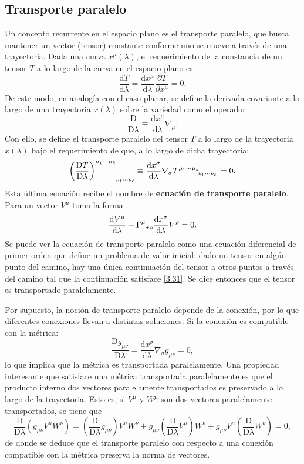\subsection{Transporte paralelo}
Un concepto recurrente en el espacio plano es el transporte paralelo, que busca mantener un vector (tensor) constante conforme uno se mueve a través de una trayectoria. Dada una curva $x^\mu(\lambda)$, el requerimiento de la constancia de un tensor $T$ a lo largo de la curva en el espacio plano es $$\frac{\mathrm{d}T}{\mathrm{d}\lambda}=\frac{\mathrm{d}x^\mu}{\mathrm{d}\lambda}\frac{\partial T}{\partial x^\mu}=0.$$ De este modo, en analogía con el caso planar, se define la derivada covariante a lo largo de una trayectoria $x(\lambda)$  sobre la variedad como el operador
\begin{equation}
\frac{\mathrm{D}}{\mathrm{D}\lambda}\equiv \frac{\mathrm{d}x^\mu}{\mathrm{d}\lambda}\nabla_\mu.
\end{equation}
Con ello, se define el transporte paralelo del tensor $T$ a lo largo de la trayectoria $x(\lambda)$ bajo el requerimiento de que, a lo largo de dicha trayectoria:
\begin{equation}\label{3.31}
\left(\frac{\mathrm{D}T}{\mathrm{D}\lambda}\right)\indices{^{\mu_1\cdots\mu_k}_{\nu_1\cdots\nu_\ell}}\equiv \frac{\mathrm{d}x^\sigma}{\mathrm{d}\lambda}\nabla_\sigma T\indices{^{\mu_1\cdots\mu_k}_{\nu_1\cdots\nu_\ell}}=0.
\end{equation}
Esta última ecuación recibe el nombre de \textbf{ecuación de transporte paralelo}. Para un vector $V^\mu$ toma la forma
\begin{equation}
	\frac{\mathrm{d}V^\mu}{\mathrm{d}\lambda}+\Gamma\indices{^\mu_{\sigma\rho}}\frac{\mathrm{d}x^\sigma}{\mathrm{d}\lambda}V^\rho=0.
\end{equation}
Se puede ver la ecuación de transporte paralelo como una ecuación diferencial de primer orden que define un problema de valor inicial: dado un tensor en algún punto del camino, hay una única continuación del tensor a otros puntos a través del camino tal que la continuación satisface \eqref{3.31}. Se dice entonces que el tensor es transportado paralelamente.

Por supuesto, la noción de transporte paralelo depende de la conexión, por lo que diferentes conexiones llevan a distintas soluciones. Si la conexión es compatible con la métrica:
$$\frac{\mathrm{D}g_{\mu\nu}}{\mathrm{D}\lambda}=\frac{\mathrm{d}x^\sigma}{\mathrm{d}\lambda}\nabla_\sigma g_{\mu\nu}=0,$$
lo que implica que la métrica es transportada paralelamente. Una propiedad interesante que satisface una métrica transportada paralelamente es que el producto interno dos vectores paralelamente transportados es preservado a lo largo de la trayectoria. Esto es, si $V^\mu$ y $W^\mu$ son dos vectores paralelamente transportados, se tiene que
$$\frac{\mathrm{D}}{\mathrm{D}\lambda}\left( g_{\mu\nu}V^\mu W^\nu\right)=\left(\frac{\mathrm{D}}{\mathrm{D}\lambda}g_{\mu\nu}\right)V^\mu W^\nu+g_{\mu\nu}\left(\frac{\mathrm{D}}{\mathrm{D}\lambda}V^\mu\right)W^\nu+g_{\mu\nu}V^\mu \left(\frac{\mathrm{D}}{\mathrm{D}\lambda}W^\nu\right)=0,$$
de donde se deduce que el transporte paralelo con respecto a una conexión compatible con la métrica preserva la norma de vectores.

